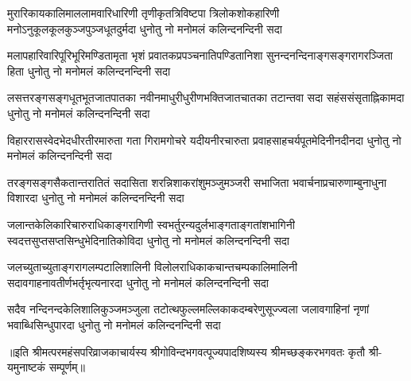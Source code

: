 
\fourlineindentedshloka
{मुरारिकायकालिमाललामवारिधारिणी}
{तृणीकृतत्रिविष्टपा त्रिलोकशोकहारिणी}
{मनोऽनुकूलकूलकुञ्जपुञ्जधूतदुर्मदा}
{धुनोतु नो मनोमलं कलिन्दनन्दिनी सदा}%

\fourlineindentedshloka
{मलापहारिवारिपूरिभूरिमण्डितामृता}
{भृशं प्रवातकप्रपञ्चनातिपण्डितानिशा}
{सुनन्दनन्दिनाङ्गसङ्गरागरञ्जिता हिता}
{धुनोतु नो मनोमलं कलिन्दनन्दिनी सदा}%

\fourlineindentedshloka
{लसत्तरङ्गसङ्गधूतभूतजातपातका}
{नवीनमाधुरीधुरीणभक्तिजातचातका}
{तटान्तवा  सदा  सहंससंसृताह्निकामदा} 
{धुनोतु नो मनोमलं कलिन्दनन्दिनी सदा}%

\fourlineindentedshloka
{विहाररासस्वेदभेदधीरतीरमारुता}
{गता गिरामगोचरे यदीयनीरचारुता}
{प्रवाहसाहचर्यपूतमेदिनीनदीनदा}
{धुनोतु नो मनोमलं कलिन्दनन्दिनी सदा}%

\fourlineindentedshloka
{तरङ्गसङ्गसैकतान्तरातितं सदासिता}
{शरन्निशाकरांशुमञ्जुमञ्जरी सभाजिता}
{भवार्चनाप्रचारुणाम्बुनाधुना विशारदा}
{धुनोतु नो मनोमलं कलिन्दनन्दिनी सदा}%

\fourlineindentedshloka
{जलान्तकेलिकारिचारुराधिकाङ्गरागिणी}
{स्वभर्तुरन्यदुर्लभाङ्गताङ्गतांशभागिनी}
{स्वदत्तसुप्तसप्तसिन्धुभेदिनातिकोविदा}
{धुनोतु नो मनोमलं कलिन्दनन्दिनी सदा}%

\fourlineindentedshloka
{जलच्युताच्युताङ्गरागलम्पटालिशालिनी}
{विलोलराधिकाकचान्तचम्पकालिमालिनी}
{सदावगाहनावतीर्णभर्तृभृत्यनारदा}
{धुनोतु नो मनोमलं कलिन्दनन्दिनी सदा}%

\fourlineindentedshloka
{सदैव नन्दिनन्दकेलिशालिकुञ्जमञ्जुला}
{तटोत्थफुल्लमल्लिकाकदम्बरेणुसूज्ज्वला}
{जलावगाहिनां नृणां भवाब्धिसिन्धुपारदा}
{धुनोतु नो मनोमलं कलिन्दनन्दिनी सदा}%

॥इति श्रीमत्परमहंसपरिव्राजकाचार्यस्य श्रीगोविन्दभगवत्पूज्यपादशिष्यस्य 
श्रीमच्छङ्करभगवतः कृतौ श्री-यमुनाष्टकं सम्पूर्णम्॥
